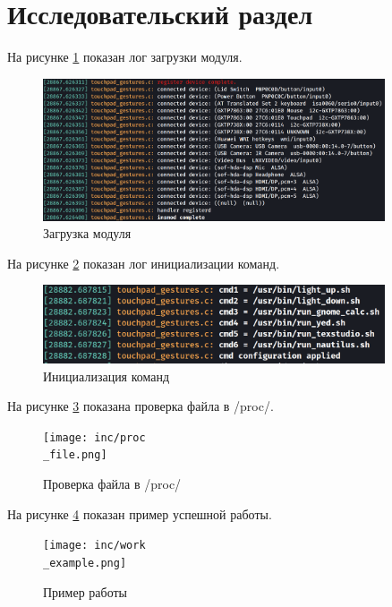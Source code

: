 \section{Исследовательский раздел}

На рисунке \ref{fig:insmod} показан лог загрузки модуля.

\begin{figure}[h!btp]
	\centering
	\includegraphics[width=0.9\textwidth]{inc/insmod.png}
	\caption{Загрузка модуля}
	\label{fig:insmod}
\end{figure}

На рисунке \ref{fig:init} показан лог инициализации команд.

\begin{figure}[h!btp]
	\centering
	\includegraphics[width=0.9\textwidth]{inc/init.png}
	\caption{Инициализация команд}
	\label{fig:init}
\end{figure}

На рисунке \ref{fig:proc_file} показана проверка файла в /proc/.

\begin{figure}[h!btp]
	\centering
	\texttt{[image: inc/proc\\\_file.png]}
	\caption{Проверка файла в /proc/}
	\label{fig:proc_file}
\end{figure}

На рисунке \ref{fig:work_example} показан пример успешной работы.

\begin{figure}[H]
	\centering
	\texttt{[image: inc/work\\\_example.png]}
	\caption{Пример работы}
	\label{fig:work_example}
\end{figure}

